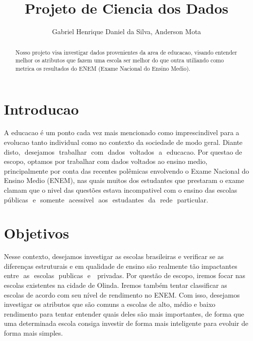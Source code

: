 \documentclass[review]{elsarticle}
\begin{document}
\begin{frontmatter}

\title{Projeto de Ciencia dos Dados}

\author{Gabriel Henrique Daniel da Silva, Anderson Mota}
\address{Recife, Pernambuco}

\begin{abstract}
Nosso projeto visa investigar dados provenientes da area de educacao, visando entender melhor os atributos que fazem uma escola ser melhor do que outra utiliando como metrica os resultados do ENEM (Exame Nacional do Ensino Medio).
\end{abstract}

\end{frontmatter}

\linenumbers

\section{Introducao}

A educacao é um ponto cada vez mais mencionado como imprescindivel
para a evolucao tanto individual como no contexto da sociedade de modo geral.
Diante​ ​ disto,​ ​ desejamos​ ​ trabalhar​ ​ com​ ​ dados​ ​ voltados​ ​ a ​ ​ educacao.
Por questao de escopo, optamos por trabalhar com dados voltados ao ensino
medio, principalmente por conta das recentes polêmicas envolvendo o Exame
Nacional do Ensino Medio (ENEM), nas quais muitos dos estudantes que prestaram
o exame clamam que o nivel das questões estava incompativel com o ensino das
escolas​ ​ públicas​ ​ e ​ ​ somente​ ​ acessivel​ ​ aos​ ​ estudantes​ ​ da​ ​ rede​ ​ particular.

\section{Objetivos}

Nesse contexto, desejamos investigar as escolas brasileiras e verificar se as
diferenças estruturais e em qualidade de ensino são realmente tão impactantes
entre​ ​ as​ ​ escolas​ ​ publicas​ ​ e ​ ​ privadas. Por questão de escopo, iremos focar nas escolas existentes na cidade de Olinda.
Iremos também tentar classificar as escolas de acordo com seu nível de
rendimento no ENEM. Com isso, desejamos investigar os atributos que são comuns
a escolas de alto, médio e baixo rendimento para tentar entender quais deles são
mais importantes, de forma que uma determinada escola consiga investir de forma mais inteligente para evoluir de forma mais simples.
\end{document}
